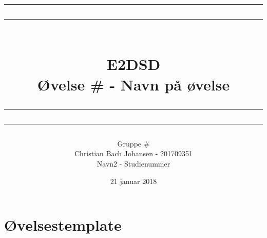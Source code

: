 \documentclass[12pt,a4paper]{article}
\newcommand\mymaketitle[1]{
   \rule{\textwidth}{1.6pt}\vspace*{-\baselineskip}\vspace*{2pt}
   \rule{\textwidth}{0.4pt}
   \\  
   \huge \bf #1\\
   \vspace{-8pt}
   \rule{\textwidth}{0.4pt}\vspace*{-\baselineskip}\vspace{3.2pt}
   \rule{\textwidth}{1.6pt}
}
\begin{document}
\title{
	\mymaketitle{E2DSD\\Øvelse \# - Navn på øvelse}
}
\author{
	Gruppe \#\\
	Christian Bach Johansen - 201709351\\
	Navn2 - Studienummer
}
\date{21 januar 2018}

\maketitle



\section{Øvelsestemplate}


\end{document}
